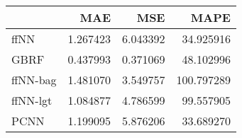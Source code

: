 \begin{tabular}{lrrr}
\toprule
{} &       MAE &       MSE &        MAPE \\
\midrule
ffNN     &  1.267423 &  6.043392 &   34.925916 \\
GBRF     &  0.437993 &  0.371069 &   48.102996 \\
ffNN-bag &  1.481070 &  3.549757 &  100.797289 \\
ffNN-lgt &  1.084877 &  4.786599 &   99.557905 \\
PCNN     &  1.199095 &  5.876206 &   33.689270 \\
\bottomrule
\end{tabular}
